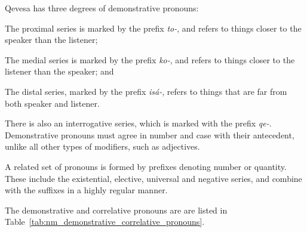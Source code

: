 \documentclass[grammar]{subfiles}
\begin{document}
	Qevesa has three degrees of demonstrative pronouns:

	\begin{description}[style=nextline]
		\item[Proximal] The proximal series is marked by the prefix \textit{to-}, and refers to things closer to the speaker than the listener;
		\item[Medial] The medial series is marked by the prefix \textit{ko-}, and refers to things closer to the listener than the speaker; and
		\item[Distal] The distal series, marked by the prefix \textit{isá-}, refers to things that are far from both speaker and listener.
	\end{description}

	There is also an interrogative series, which is marked with the prefix \textit{qe-}. Demonstrative pronouns must agree in number and case with their antecedent, unlike all other types of modifiers, such as adjectives. 

	A related set of pronouns is formed by prefixes denoting number or quantity. These include the existential, elective, universal and negative series, and combine with the suffixes in a highly regular manner. 

	The demonstrative and correlative pronouns are are listed in Table~\ref{tab:nm_demonstrative_correlative_pronouns}.
\end{document}
